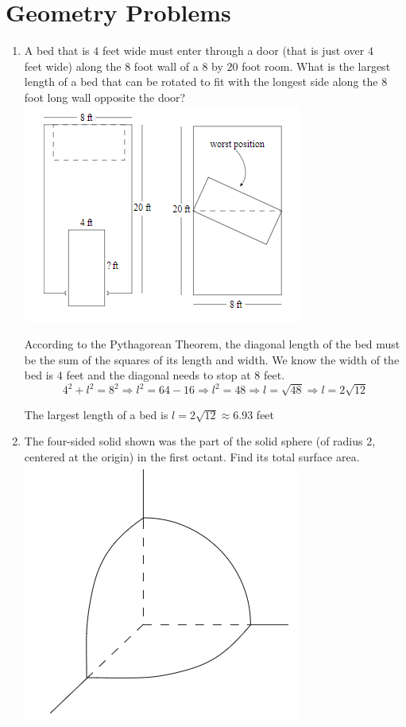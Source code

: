 \documentclass{article}
\begin{document}
\section{Geometry Problems}
\begin{enumerate}
\item A bed that is $4$ feet wide must enter through a door (that is just over $4$\\
feet wide) along the $8$ foot wall of a $8$ by $20$ foot room. What is the largest\\
length of a bed that can be rotated to fit with the longest side along the $8$\\
foot long wall opposite the door?
\\\includegraphics[scale=1]{Images/Geo1.png}

According to the Pythagorean Theorem, the diagonal length of the bed must be the
sum of the squares of its length and width.
We know the width of the bed is $4$ feet and the diagonal needs to stop at $8$ feet.
\[4^{2} + l^{2} = 8^{2} \Longrightarrow l^{2} = 64 - 16 \Longrightarrow l^{2} = 48
    \Longrightarrow l = \sqrt{48} \Longrightarrow l = 2\sqrt{12}\]

The largest length of a bed is $l = 2\sqrt{12} \approx 6.93$ feet

\pagebreak
\item The four-sided solid shown was the part of the solid sphere (of radius 2,\\
centered at the origin) in the first octant. Find its total surface area.
\\\includegraphics[scale = 1]{Images/Geo2.png}


\end{enumerate}
\end{document}
